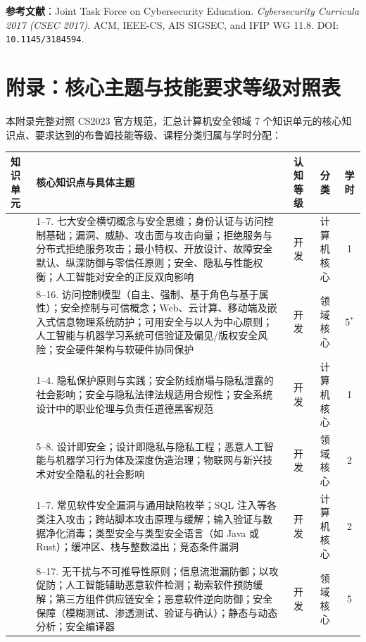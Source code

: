 \noindent\textbf{参考文献}：Joint Task Force on Cybersecurity Education. \textit{Cybersecurity Curricula 2017 (CSEC 2017)}. ACM, IEEE-CS, AIS SIGSEC, and IFIP WG 11.8. DOI: \texttt{10.1145/3184594}.

\clearpage
\onecolumn
\section{附录：核心主题与技能要求等级对照表}

本附录完整对照 CS2023 官方规范，汇总计算机安全领域 7 个知识单元的核心知识点、要求达到的布鲁姆技能等级、课程分类归属与学时分配：

\begingroup
{}\renewcommand{\arraystretch}{0.92}\setlength{\tabcolsep}{3pt}
\noindent\begin{tabularx}{\textwidth}{>{\raggedright\arraybackslash}p{} Y c c c}
\toprule
\textbf{知识单元} & \textbf{核心知识点与具体主题} & \textbf{认知等级} & \textbf{分类} & \textbf{学时} \\
\midrule
{} 
& 1--7. 七大安全横切概念与安全思维；身份认证与访问控制基础；漏洞、威胁、攻击面与攻击向量；拒绝服务与分布式拒绝服务攻击；最小特权、开放设计、故障安全默认、纵深防御与零信任原则；安全、隐私与性能权衡；人工智能对安全的正反双向影响 & 开发 & 计算机核心 & 1 \\
& 8--16. 访问控制模型（自主、强制、基于角色与基于属性）；安全控制与可信概念；Web、云计算、移动端及嵌入式信息物理系统防护；可用安全与以人为中心原则；人工智能与机器学习系统可信验证及偏见/版权安全风险；安全硬件架构与软硬件协同保护 & 开发 & 领域核心 & 5$^*$ \\
\midrule
{} 
& 1--4. 隐私保护原则与实践；安全防线崩塌与隐私泄露的社会影响；安全与隐私法律法规适用合规性；安全系统设计中的职业伦理与负责任道德黑客规范 & 开发 & 计算机核心 & 1 \\
& 5--8. 设计即安全；设计即隐私与隐私工程；恶意人工智能与机器学习行为体及深度伪造治理；物联网与新兴技术对安全隐私的社会影响 & 开发 & 领域核心 & 2 \\
\midrule
{} 
& 1--7. 常见软件安全漏洞与通用缺陷枚举；SQL 注入等各类注入攻击；跨站脚本攻击原理与缓解；输入验证与数据净化消毒；类型安全与类型安全语言（如 Java 或 Rust）；缓冲区、栈与整数溢出；竞态条件漏洞 & 开发 & 计算机核心 & 2 \\
& 8--17. 无干扰与不可推导性原则；信息流泄漏防御；以攻促防；人工智能辅助恶意软件检测；勒索软件预防缓解；第三方组件供应链安全；恶意软件逆向防御；安全保障（模糊测试、渗透测试、验证与确认）；静态与动态分析；安全编译器 & 开发 & 领域核心 & 5 \\

\end{tabularx}
